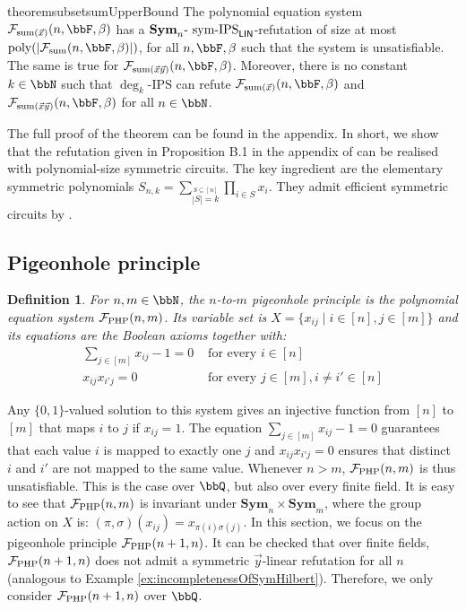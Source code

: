 \documentclass[10pt,a4paper]{article}
\newtheorem{definition}[theorem]{Definition}
\newcommand{\Sym}{{\mathbf{Sym}}}
\newcommand{\IPS}{\mathrm{IPS}}
\newcommand{\Ff}{{\cal F}}
\newcommand{\PHP}{\Ff_{\mathrm{PHP}}}
\newcommand{\poly}{\text{\upshape poly}}
\newcommand{\symIPSlin}{\text{ \upshape sym-IPS}_{\mathsf{LIN}}}
\begin{document}
\begin{restatable}{theorem}{subsetsumUpperBound}
	\label{thm:symRefutationSubsetSum}
	The polynomial equation system $\Ff_{\text{sum}(\vec x)}(n,\bbF,\beta)$ has a $\Sym_n\text{-}\symIPSlin{}$-refutation of size at most $\poly(| \Ff_{\text{sum}}(n,\bbF,\beta) |)$, for all $n, \bbF, \beta$ such that the system is unsatisfiable.
	The same is true for $\Ff_{\text{sum}(\vec x \vec y)}(n,\bbF,\beta)$.
	 Moreover, there is no constant $k \in \bbN$ such that $\deg_k\text{-}\IPS$ can refute $\Ff_{\text{sum}(\vec x)}(n,\bbF,\beta)$ and $\Ff_{\text{sum}(\vec x \vec y)}(n,\bbF,\beta)$ for all $n \in \bbN$.
\end{restatable}	

The full proof of the theorem can be found in the appendix. In short, we show that the refutation given in Proposition B.1 in the appendix of \cite{lowerbounds_IPS} can be realised with polynomial-size symmetric circuits. The key ingredient are the elementary symmetric polynomials $S_{n,k} = \sum_{\stackrel{S \subseteq [n]}{|S| = k}} \prod_{i \in S} x_i$. They admit efficient symmetric circuits by \cite{shpilka2001depth}.


\subsection{Pigeonhole principle}


\begin{definition}
	For $n,m \in \bbN$, the $n$-to-$m$ \emph{pigeonhole principle} is the polynomial equation system $\PHP(n,m)$. Its variable set is $X = \{x_{ij} \mid i \in [n], j \in [m]\}$ and its equations are the Boolean axioms together with:
	\begin{align*}
		\sum_{j \in [m]} x_{ij} - 1 = 0&\text{    for every } i \in [n]\\
		x_{ij}x_{i'j} = 0& \text{    for every } j \in [m], i \neq i' \in [n]
	\end{align*}
\end{definition}	
Any $\{0,1\}$-valued solution to this system gives an injective function from $[n]$ to $[m]$ that maps $i$ to $j$ if $x_{ij} = 1$.  The equation $\sum_{j \in [m]} x_{ij} - 1 = 0$ guarantees that each value $i$ is mapped to exactly one $j$ and $x_{ij}x_{i'j}  = 0$ ensures that distinct $i$ and $i'$ are not mapped to the same value.
Whenever $n > m$, $\PHP(n,m)$ is thus unsatisfiable. This is the case over $\bbQ$, but also over every finite field.
It is easy to see that $\PHP(n,m)$ is invariant under $\Sym_n \times \Sym_m$, where the group action on $X$ is: $(\pi,\sigma)(x_{ij}) = x_{\pi(i)\sigma(j)}$. In this section, we focus on the pigeonhole principle $\PHP(n+1,n)$. It can be checked that over finite fields, $\PHP(n+1,n)$ does not admit a symmetric $\vec{y}$-linear refutation for all $n$ (analogous to Example \ref{ex:incompletenessOfSymHilbert}). Therefore, we only consider $\PHP(n+1,n)$ over $\bbQ$.
\end{document}
